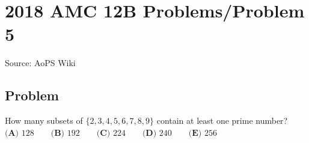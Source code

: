 \documentclass[12pt]{article}
\begin{document}
\section*{{2018 AMC 12B Problems/Problem 5}}
Source: AoPS Wiki

\subsection*{Problem}
How many subsets of $\{2,3,4,5,6,7,8,9\}$ contain at least one prime number? $\textbf{(A) } 128 \qquad \textbf{(B) } 192 \qquad \textbf{(C) } 224 \qquad \textbf{(D) } 240 \qquad \textbf{(E) } 256$
\end{document}
